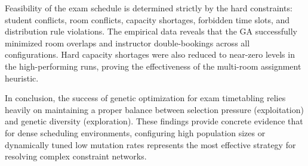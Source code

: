 Feasibility of the exam schedule is determined strictly by the hard constraints: student conflicts, room conflicts, capacity shortages, forbidden time slots, and distribution rule violations. The empirical data reveals that the GA successfully minimized room overlaps and instructor double-bookings across all configurations. Hard capacity shortages were also reduced to near-zero levels in the high-performing runs, proving the effectiveness of the multi-room assignment heuristic.

In conclusion, the success of genetic optimization for exam timetabling relies heavily on maintaining a proper balance between selection pressure (exploitation) and genetic diversity (exploration). These findings provide concrete evidence that for dense scheduling environments, configuring high population sizes or dynamically tuned low mutation rates represents the most effective strategy for resolving complex constraint networks.
